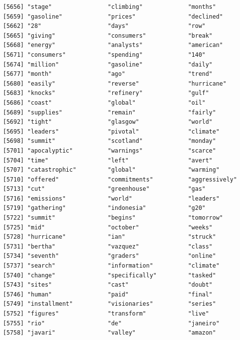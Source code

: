 \documentclass[
  letterpaper,
  DIV=11,
  numbers=noendperiod]{scrartcl}
\begin{document}
\begin{verbatim}
[5656] "stage"                "climbing"             "months"              
[5659] "gasoline"             "prices"               "declined"            
[5662] "28"                   "days"                 "row"                 
[5665] "giving"               "consumers"            "break"               
[5668] "energy"               "analysts"             "american"            
[5671] "consumers"            "spending"             "140"                 
[5674] "million"              "gasoline"             "daily"               
[5677] "month"                "ago"                  "trend"               
[5680] "easily"               "reverse"              "hurricane"           
[5683] "knocks"               "refinery"             "gulf"                
[5686] "coast"                "global"               "oil"                 
[5689] "supplies"             "remain"               "fairly"              
[5692] "tight"                "glasgow"              "world"               
[5695] "leaders"              "pivotal"              "climate"             
[5698] "summit"               "scotland"             "monday"              
[5701] "apocalyptic"          "warnings"             "scarce"              
[5704] "time"                 "left"                 "avert"               
[5707] "catastrophic"         "global"               "warming"             
[5710] "offered"              "commitments"          "aggressively"        
[5713] "cut"                  "greenhouse"           "gas"                 
[5716] "emissions"            "world"                "leaders"             
[5719] "gathering"            "indonesia"            "g20"                 
[5722] "summit"               "begins"               "tomorrow"            
[5725] "mid"                  "october"              "weeks"               
[5728] "hurricane"            "ian"                  "struck"              
[5731] "bertha"               "vazquez"              "class"               
[5734] "seventh"              "graders"              "online"              
[5737] "search"               "information"          "climate"             
[5740] "change"               "specifically"         "tasked"              
[5743] "sites"                "cast"                 "doubt"               
[5746] "human"                "paid"                 "final"               
[5749] "installment"          "visionaries"          "series"              
[5752] "figures"              "transform"            "live"                
[5755] "rio"                  "de"                   "janeiro"             
[5758] "javari"               "valley"               "amazon"              

\end{verbatim}
\end{document}
